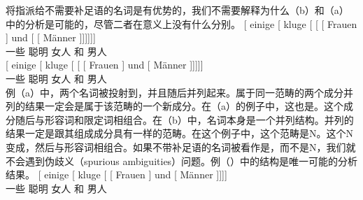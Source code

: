 将\nbarc 指派给不需要补足语的名词是有优势的，我们不需要解释为什么（b）和（a）中的分析是可能的，尽管二者在意义上没有什么分别。
\eal
\ex 
\gll {}[ einige [\sub{\nbar} kluge [\sub{\nbar} [\sub{\nbar} [ Frauen ] und  [\sub{\nbar} [ Männer ]]]]]]\\
	 {}      一些   {}           聪明 {}          {}           {}       女人  {} 和 {} {}          男人\\
\ex 
\gll {}[ einige [\sub{\nbar} kluge [\sub{\nbar} [ [ Frauen ] und [ Männer
]]]]]\\
	{}       一些   {}           聪明 {}          {}       {}       女人  {} 和 {} 男人\\
\zl
%
例（a）中，两个名词被投射到\nbarc，并且随后并列起来。属于同一范畴的两个成分并列的结果一定会是属于该范畴的一个新成分。在（a）的例子中，这也是\nbarc。这个成分随后与形容词和限定词相组合。在（b）中，名词本身是一个并列结构。并列的结果一定是跟其组成成分具有一样的范畴。在这个例子中，这个范畴是N。这个N变成\nbarc，然后与形容词相组合。如果不带补足语的名词被看作是\nbarc，而不是N，我们就不会遇到伪歧义（spurious ambiguities）问题。例（）中的结构是唯一可能的分析结果。
\ea
\gll {}[ einige [\sub{\nbar} kluge [\sub{\nbar} [\sub{\nbar} Frauen ] und [\sub{\nbar} Männer
]]]]\\
      {}         一些    {}           聪明 {}          {}           女人  {}  和 {} 男人\\
\z

